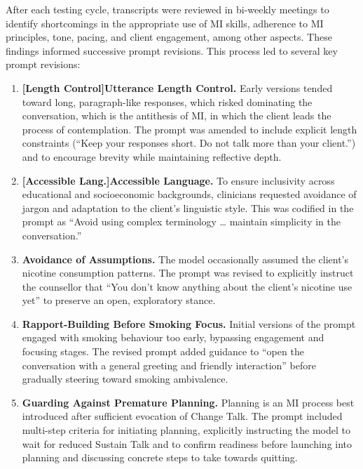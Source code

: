After each testing cycle, transcripts were reviewed in bi-weekly meetings to identify shortcomings in the appropriate use of MI skills, adherence to MI principles, tone, pacing, and client engagement, among other aspects. These findings informed successive prompt revisions. 
This process led to several key prompt revisions:


\begin{enumerate}
    \item \textbf{[Length Control]Utterance Length Control.} Early versions tended toward long, paragraph-like responses, which risked dominating the conversation, which is the antithesis of MI, in which the client leads the process of contemplation.  The prompt was amended to include explicit length constraints (``Keep your responses short. Do not talk more than your client.'') and to encourage brevity while maintaining reflective depth.

    \item \textbf{[Accessible Lang.]Accessible Language.} To ensure inclusivity across educational and socioeconomic backgrounds, clinicians requested avoidance of jargon and adaptation to the client's linguistic style. This was codified in the prompt as ``Avoid using complex terminology … maintain simplicity in the conversation.''

    \item \textbf{Avoidance of Assumptions.} The model occasionally assumed the client's nicotine consumption patterns. The prompt was revised to explicitly instruct the counsellor that ``You don't know anything about the client's nicotine use yet'' to preserve an open, exploratory stance.

    \item \textbf{Rapport-Building Before Smoking Focus.} Initial versions of the prompt engaged with smoking behaviour too early, bypassing engagement and focusing stages. The revised prompt added guidance to ``open the conversation with a general greeting and friendly interaction'' before gradually steering toward smoking ambivalence.

    \item \textbf{Guarding Against Premature Planning.} Planning is an MI process best introduced after sufficient evocation of Change Talk. The prompt included multi-step criteria for initiating planning, explicitly instructing the model to wait for reduced Sustain Talk and to confirm readiness before launching into planning and discussing concrete steps to take towards quitting.

    
\end{enumerate}



